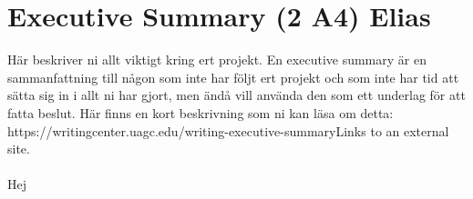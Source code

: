 \section{Executive Summary (2 A4) Elias}
Här beskriver ni allt viktigt kring ert projekt. En executive summary är en sammanfattning till någon som inte har följt ert projekt och som inte har tid att sätta sig in i allt ni har gjort, men ändå vill använda den som ett underlag för att fatta beslut. Här finns en kort beskrivning som ni kan läsa om detta: https://writingcenter.uagc.edu/writing-executive-summaryLinks to an external site.
\\
\\
Hej